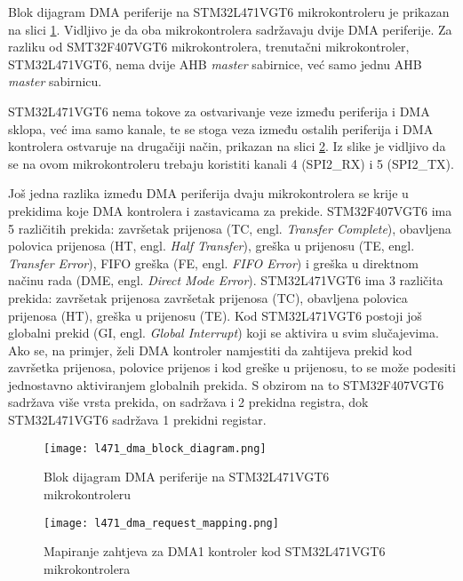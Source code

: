 Blok dijagram DMA periferije na STM32L471VGT6 mikrokontroleru je prikazan na slici \ref{fig:l471_dma_block_diagram}. Vidljivo je da oba mikrokontrolera sadržavaju dvije DMA periferije. Za razliku od SMT32F407VGT6 mikrokontrolera, trenutačni mikrokontroler, STM32L471VGT6, nema dvije AHB \textit{master} sabirnice, već samo jednu AHB \textit{master} sabirnicu.

STM32L471VGT6 nema tokove za ostvarivanje veze između periferija i DMA sklopa, već ima samo kanale, te se stoga veza između ostalih periferija i DMA kontrolera ostvaruje na drugačiji način, prikazan na slici \ref{fig:l471_dma_request_mapping}. Iz slike je vidljivo da se na ovom mikrokontroleru trebaju koristiti kanali 4 (SPI2\_RX) i 5 (SPI2\_TX).

Još jedna razlika između DMA periferija dvaju mikrokontrolera se krije u prekidima koje DMA kontrolera i zastavicama za prekide. STM32F407VGT6 ima 5 različitih prekida: završetak prijenosa (TC, engl. \textit{Transfer Complete}), obavljena polovica prijenosa (HT, engl. \textit{Half Transfer}), greška u prijenosu (TE, engl. \textit{Transfer Error}), FIFO greška (FE, engl. \textit{FIFO Error}) i greška u direktnom načinu rada (DME, engl. \textit{Direct Mode Error}). STM32L471VGT6 ima 3 različita prekida: završetak prijenosa završetak prijenosa (TC), obavljena polovica prijenosa (HT), greška u prijenosu (TE). Kod STM32L471VGT6 postoji još globalni prekid (GI, engl. \textit{Global Interrupt}) koji se aktivira u svim slučajevima. Ako se, na primjer, želi DMA kontroler namjestiti da zahtijeva prekid kod završetka prijenosa, polovice prijenos i kod greške u prijenosu, to se može podesiti jednostavno aktiviranjem globalnih prekida. S obzirom na to STM32F407VGT6 sadržava više vrsta prekida, on sadržava i 2 prekidna registra, dok STM32L471VGT6 sadržava 1 prekidni registar.

\begin{figure}[H]
	\centering
	\texttt{[image: l471\_dma\_block\_diagram.png]}
	\caption{Blok dijagram DMA periferije na STM32L471VGT6 mikrokontroleru \cite{l471_manual}}
	\label{fig:l471_dma_block_diagram}
\end{figure}

\begin{figure}[H]
	\centering
	\texttt{[image: l471\_dma\_request\_mapping.png]}
	\caption{Mapiranje zahtjeva za DMA1 kontroler kod STM32L471VGT6 mikrokontrolera \cite[str. 338]{l471_manual}}
	\label{fig:l471_dma_request_mapping}
\end{figure}

